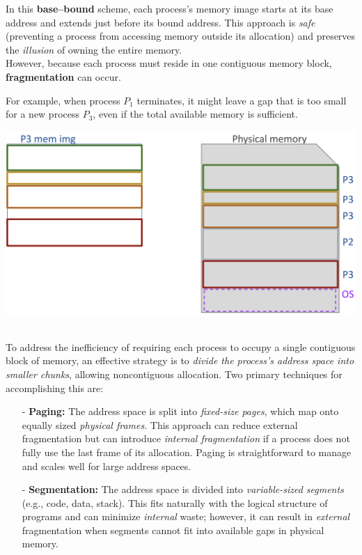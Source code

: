 \noindent In this \textbf{base--bound} scheme, each process’s memory image starts at its base address and extends just before its bound address. This approach is \textit{safe} (preventing a process from accessing memory outside its allocation) and preserves the \textit{illusion} of owning the entire memory. \\[3px]

However, because each process must reside in one contiguous memory block, \textbf{fragmentation} can occur. \\[15px]
\noindent
\begin{minipage}{0.45\textwidth}
For example, when process \(P_1\) terminates, it might leave a gap that is too small for a new process \(P_3\), even if the total available memory is sufficient.
\end{minipage}%
\hfill
\vline
\hfill
\begin{minipage}{0.45\textwidth}
\begin{center}
  \includegraphics[width=1.25\textwidth]{chapters/L4/images/segmentation.png}
\end{center}
\end{minipage}
\\[20px]
\newpage
\noindent To address the inefficiency of requiring each process to occupy a single contiguous block of memory, an effective strategy is to \emph{divide the process’s address space into smaller chunks}, allowing noncontiguous allocation. Two primary techniques for accomplishing this are:
\vspace{10px}
\begin{itemize}
  \item[-] \textbf{Paging:} The address space is split into \emph{fixed-size pages}, which map onto equally sized \emph{physical frames}. This approach can reduce external fragmentation but can introduce \emph{internal fragmentation} if a process does not fully use the last frame of its allocation. Paging is straightforward to manage and scales well for large address spaces.
  \item[-] \textbf{Segmentation:} The address space is divided into \emph{variable-sized segments} (e.g., code, data, stack). This fits naturally with the logical structure of programs and can minimize \emph{internal} waste; however, it can result in \emph{external} fragmentation when segments cannot fit into available gaps in physical memory.
\end{itemize}

